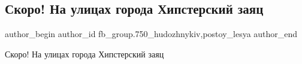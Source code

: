  
 
 
 
 

\subsection{Скоро! На улицах города Хипстерский заяц}
\label{sec:03_04_2018.fb.fb_group.750_hudozhnykiv.4.skoro_na_ulicah_goroda_hipsterskij_zajac}
 
\ifcmt
 author_begin
   author_id fb_group.750_hudozhnykiv,postoy_lesya
 author_end
\fi

Скоро! На улицах города Хипстерский заяц 🙂

